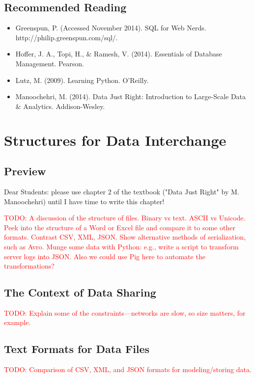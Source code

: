 \documentclass[11pt]{book}
\newcommand{\todo}[1]{\textcolor{red}{TODO: #1}} %
\begin{document}
\section*{Recommended Reading}
\begin{itemize}
    \item Greenspun, P.  (Accessed November 2014). SQL for Web Nerds.\\ http://philip.greenspun.com/sql/.
    \item Hoffer, J. A., Topi, H., \& Ramesh, V. (2014). Essentials of Database Management.  Pearson.
    \item Lutz, M. (2009). Learning Python.  O'Reilly.
    \item Manoochehri, M. (2014). Data Just Right: Introduction to Large-Scale Data \& Analytics. Addison-Wesley.
\end{itemize}







\chapter{Structures for Data Interchange}

\section*{Preview}

Dear Students:  please use chapter 2 of the textbook ("Data Just Right" by M. Manoochehri) until I have time to write this chapter!

\todo{A discussion of the structure of files.  Binary vs text.  ASCII vs Unicode.  Peek into the structure of a Word or Excel file and compare it to some other formats.  Contrast CSV, XML, JSON.  Show alternative methods of serialization, such as Avro.
Munge some data with Python: e.g., write a script to transform server logs into JSON.
Also we could use Pig here to automate the transformations?}

\section{The Context of Data Sharing}
\todo{Explain some of the constraints---networks are slow, so size matters, for example.}

\section{Text Formats for Data Files}
\todo{Comparison of CSV, XML, and JSON formats for modeling/storing data.}
\end{document}
